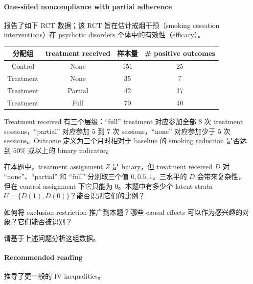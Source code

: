  
 
 
 
  \paragraph{One-sided noncompliance with partial adherence}
\label{para::one-sided-partial-adherence}
 
\citet[][Table 3]{sanders2021incorporating} 报告了如下 RCT 数据；该 RCT 旨在估计戒烟干预（smoking cessation interventions）在 psychotic disorders 个体中的有效性（efficacy）。

\begin{center}
\begin{tabular}{cccc}
\hline  
分配组 & treatment received & 样本量 & \# positive outcomes \\
\hline  
Control & None& 151 &25 \\
Treatment& None& 35 & 7 \\
Treatment& Partial& 42& 17 \\
Treatment& Full& 70& 40\\
\hline 
\end{tabular}
\end{center}

Treatment received 有三个层级：``full'' treatment 对应参加全部 $8$ 次 treatment sessions，``partial'' 对应参加 $5$ 到 $7$ 次 sessions，``none'' 对应参加少于 $5$ 次 sessions。Outcome 定义为三个月时相对于 baseline 的 smoking reduction 是否达到 $50\%$ 或以上的 binary indicator。


在本题中，treatment assignment $Z$ 是 binary，但 treatment received $D$ 对 ``none''、``partial'' 和 ``full'' 分别取三个值 $0, 0.5, 1$。三水平的 $D$ 会带来复杂性，但在 control assignment 下它只能为 $0$。本题中有多少个 latent strata $U = \{ D(1), D(0) \} $？能否识别它们的比例？

如何将 exclusion restriction 推广到本题？哪些 causal effects 可以作为感兴趣的对象？它们能否被识别？

请基于上述问题分析这组数据。



  

 \paragraph{Recommended reading}

\citet{balke1997bounds} 推导了更一般的 IV inequalities。
